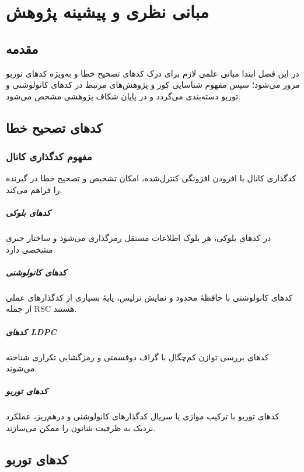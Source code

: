 \chapter{مبانی نظری و پیشینه پژوهش}
\label{chap:background}

\section{مقدمه}
در این فصل ابتدا مبانی علمی لازم برای درک کدهای تصحیح خطا و به‌ویژه کدهای توربو مرور می‌شود؛ سپس مفهوم شناسایی کور و پژوهش‌های مرتبط در کدهای کانولوشنی و توربو دسته‌بندی می‌گردد و در پایان شکاف پژوهشی مشخص می‌شود.

\section{کدهای تصحیح خطا}
\subsection{مفهوم کدگذاری کانال}
کدگذاری کانال با افزودن افزونگی کنترل‌شده، امکان تشخیص و تصحیح خطا در گیرنده را فراهم می‌کند.

\paragraph{کدهای بلوکی}
در کدهای بلوکی، هر بلوک اطلاعات مستقل رمزگذاری می‌شود و ساختار جبری مشخصی دارد.

\paragraph{کدهای کانولوشنی}
کدهای کانولوشنی با حافظهٔ محدود و نمایش ترلیس، پایهٔ بسیاری از کدگذارهای عملی از جمله RSC هستند.

\paragraph{کدهای LDPC}
کدهای بررسی توازن کم‌چگال با گراف دوقسمتی و رمزگشایی تکراری شناخته می‌شوند.

\paragraph{کدهای توربو}
کدهای توربو با ترکیب موازی یا سریال کدگذارهای کانولوشنی و درهم‌ریز، عملکرد نزدیک به ظرفیت شانون را ممکن می‌سازند.

\section{کدهای توربو}
